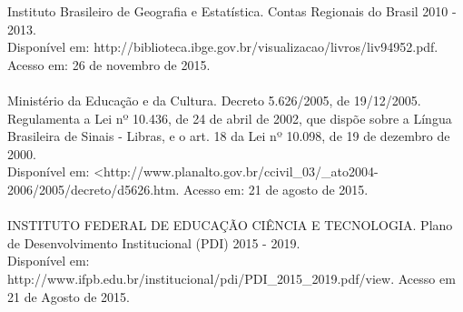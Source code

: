 Instituto Brasileiro de Geografia e Estatística. Contas Regionais do Brasil 2010 - 2013.\\
Disponível em: http://biblioteca.ibge.gov.br/visualizacao/livros/liv94952.pdf. Acesso em: 26 de novembro de 2015.
\\
\\
Ministério da Educação e da Cultura. Decreto 5.626/2005, de 19/12/2005. Regulamenta a Lei nº 10.436, de 24 de abril de 2002, que dispõe sobre a Língua Brasileira de Sinais - Libras, e o art. 18 da Lei nº 10.098, de 19 de dezembro de 2000.\\
Disponível em: <http://www.planalto.gov.br/ccivil\_03/\_ato2004-2006/2005/decreto/d5626.htm. Acesso em: 21 de agosto de 2015.
\\
\\
INSTITUTO FEDERAL DE EDUCAÇÃO CIÊNCIA E TECNOLOGIA. Plano de Desenvolvimento Institucional (PDI) 2015 - 2019.\\
Disponível em: http://www.ifpb.edu.br/institucional/pdi/PDI\_2015\_2019.pdf/view. 
Acesso em 21 de Agosto de 2015.
